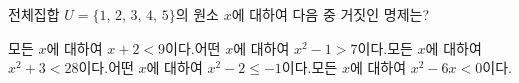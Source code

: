전체집합 $U=\{1,\,2,\,3,\,4,\,5\}$의 원소 $x$에 대하여 다음 중 거짓인 명제는?
\begin{choicesv}{모든 $x$에 대하여 $x+2<9$이다.}{어떤 $x$에 대하여 $x^2-1>7$이다.}{모든 $x$에 대하여 $x^2+3<28$이다.}{어떤 $x$에 대하여 $x^2-2\le -1$이다.}{모든 $x$에 대하여 $x^2-6x<0$이다.}\end{choicesv}
